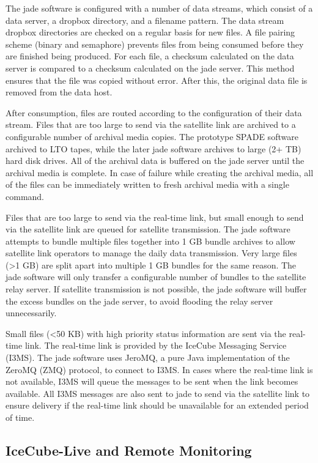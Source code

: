 The jade software is configured with a number of data streams, which consist of a data server, a dropbox directory, and a filename pattern.
The data stream dropbox directories are checked on a regular basis for new files. A file pairing scheme (binary and semaphore) prevents files
from being consumed before they are finished being produced. For each file, a checksum calculated on the data server is compared to a checksum
calculated on the jade server. This method ensures that the file was copied without error. After this, the original data file is removed from the data host.

After consumption, files are routed according to the configuration of their data stream. Files that are too large to send via the satellite link are archived to
a configurable number of archival media copies. The prototype SPADE software archived to LTO tapes, while the later jade software archives to large (2+ TB) hard
disk drives. All of the archival data is buffered on the jade server until the archival media is complete. In case of failure while creating the archival media,
all of the files can be immediately written to fresh archival media with a single command.

Files that are too large to send via the real-time link, but small enough to send via the satellite link are queued for satellite transmission. The jade software
attempts to bundle multiple files together into 1 GB bundle archives to allow satellite link operators to manage the daily data transmission. Very large files
(>1 GB) are split apart into multiple 1 GB bundles for the same reason. The jade software will only transfer a configurable number of bundles to the satellite
relay server. If satellite transmission is not possible, the jade software will buffer the excess bundles on the jade server, to avoid flooding the relay server
unnecessarily.


Small files (<50 KB) with high priority status information are sent via the real-time link. The real-time link is provided by the IceCube Messaging Service
(I3MS). The jade software uses JeroMQ, a pure Java implementation of the ZeroMQ (ZMQ) protocol, to connect to I3MS. In cases where the real-time link is not
available, I3MS will queue the messages to be sent when the link becomes available. All I3MS messages are also sent to jade to send via the satellite link to
ensure delivery if the real-time link should be unavailable for an extended period of time.

\subsection{IceCube-Live and Remote Monitoring}

